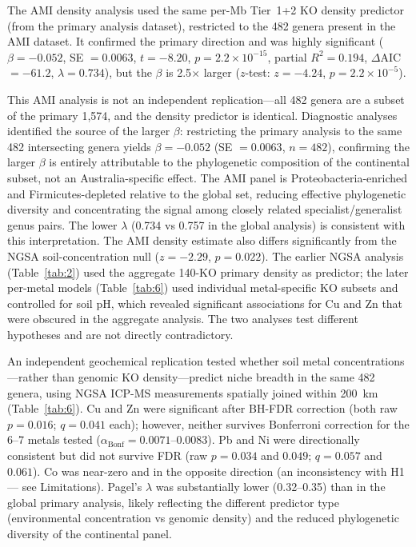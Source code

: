 \documentclass[times]{zHenriquesLab-StyleBioRxiv}
\begin{document}
The AMI density analysis used the same per-Mb Tier~1+2 KO
density predictor (from the primary analysis dataset),
restricted to the 482 genera present in the AMI dataset. It
confirmed the primary direction and was highly significant ($\beta = -0.052$,
SE $= 0.0063$, $t = -8.20$, $p = 2.2 \times 10^{-15}$, partial $R^2 = 0.194$,
$\Delta$AIC $= -61.2$, $\lambda = 0.734$), but the $\beta$ is 2.5$\times$
larger ($z$-test: $z = -4.24$, $p = 2.2 \times 10^{-5}$).

This AMI analysis is not an independent replication---all 482 genera
are a subset of the primary 1,574, and the density predictor is identical.
Diagnostic analyses identified the source of the larger $\beta$: restricting
the primary analysis to the same 482 intersecting genera yields $\beta = -0.052$
(SE $= 0.0063$, $n = 482$), confirming the larger $\beta$ is entirely
attributable to the phylogenetic composition of the continental subset, not an
Australia-specific effect. The AMI panel is Proteobacteria-enriched and
Firmicutes-depleted relative to the global set, reducing effective phylogenetic
diversity and concentrating the signal among closely related specialist/generalist
genus pairs. The lower $\lambda$ (0.734 vs 0.757 in the global analysis) is
consistent with this interpretation. The AMI density estimate also
differs significantly from the NGSA soil-concentration null ($z = -2.29$, $p = 0.022$).
The earlier NGSA analysis (Table~\ref{tab:2}) used the aggregate 140-KO primary
density as predictor; the later per-metal models (Table~\ref{tab:6}) used
individual metal-specific KO subsets and controlled for soil pH, which revealed
significant associations for Cu and Zn that were obscured in the aggregate
analysis. The two analyses test different hypotheses and are not directly
contradictory.

An independent geochemical replication tested whether soil metal
concentrations---rather than genomic KO density---predict niche breadth in the
same 482 genera, using NGSA ICP-MS measurements spatially joined within 200~km
(Table~\ref{tab:6}). Cu and Zn were significant after BH-FDR correction
(both raw $p = 0.016$; $q = 0.041$ each); however, neither survives Bonferroni correction for the 6--7 metals tested ($\alpha_\text{Bonf} = 0.0071$--$0.0083$). Pb and Ni were directionally consistent
but did not survive FDR (raw $p = 0.034$ and $0.049$; $q = 0.057$ and $0.061$). Co was near-zero and in the opposite direction (an inconsistency with H1 — see Limitations).
Pagel's $\lambda$ was substantially lower (0.32--0.35) than in the global
primary analysis, likely reflecting the different predictor type (environmental
concentration vs genomic density) and the reduced phylogenetic diversity of the
continental panel.
\end{document}
